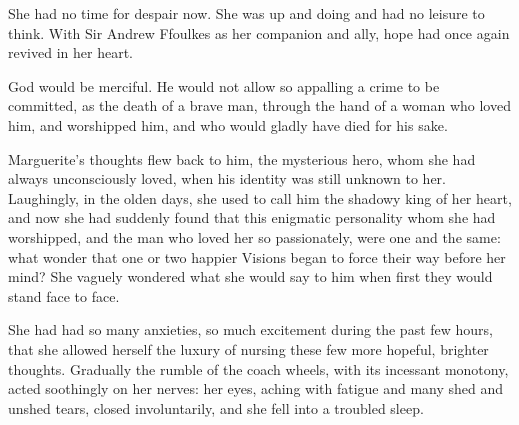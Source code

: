 She had no time for despair now. She was up and doing and had no leisure to think. With Sir Andrew Ffoulkes as her companion and ally, hope had once again revived in her heart.

God would be merciful. He would not allow so appalling a crime to be committed, as the death of a brave man, through the hand of a woman who loved him, and worshipped him, and who would gladly have died for his sake.

Marguerite's thoughts flew back to him, the mysterious hero, whom she had always unconsciously loved, when his identity was still unknown to her. Laughingly, in the olden days, she used to call him the shadowy king of her heart, and now she had suddenly found that this enigmatic personality whom she had worshipped, and the man who loved her so passionately, were one and the same: what wonder that one or two happier Visions began to force their way before her mind? She vaguely wondered what she would say to him when first they would stand face to face.

She had had so many anxieties, so much excitement during the past few hours, that she allowed herself the luxury of nursing these few more hopeful, brighter thoughts. Gradually the rumble of the coach wheels, with its incessant monotony, acted soothingly on her nerves: her eyes, aching with fatigue and many shed and unshed tears, closed involuntarily, and she fell into a troubled sleep.
